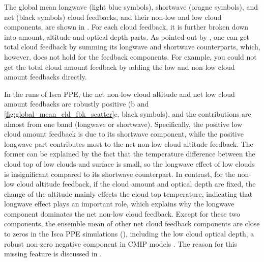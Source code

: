 The global mean longwave (light blue symbols), shortwave (oragne symbols), and net (black symbols) cloud feedbacks, and their non-low and low cloud components, are shown in . For each cloud feedback, it is further broken down into amount, altitude and optical depth parts. As pointed out by \cite{Zelinka2012computing2}, one can get total cloud feedback by summing its longwave and shortwave counterparts, which, however, does not hold for the feedback components. For example, you could not get the total cloud amount feedback by adding the low and non-low cloud amount feedbacks directly.

In the runs of Isca PPE, the net non-low cloud altitude and net low cloud amount feedbacks are robustly positive (b and \ref{fig:global_mean_cld_fbk_scatter}c, black symbols), and the contributions are almost from one band (longwave or shortwave). Specifically, the positive low cloud amount feedback is due to its shortwave component, while the positive longwave part contributes most to the net non-low cloud altitude feedback. The former can be explained by the fact that the temperature difference between the cloud top of low clouds and surface is small, so the longwave effect of low clouds is insignificant compared to its shortwave counterpart. In contrast, for the non-low cloud altitude feedback, if the cloud amount and optical depth are fixed, the change of the altitude mainly effects the cloud top temperature, indicating that longwave effect plays an important role, which explains why the longwave component dominates the net non-low cloud feedback. Except for these two components, the ensemble mean of other net cloud feedback components are close to zeros in the Isca PPE simulations (), including the low cloud optical depth, a robust non-zero negative component in CMIP models \citep[e.g.,][]{Zelinka2016insights,Ceppi2017,Zelinka2020causes}. The reason for this missing feature is discussed in .

